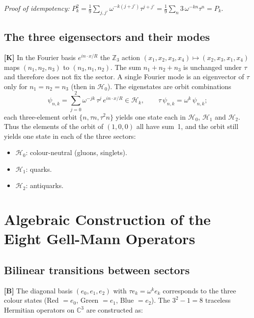 \emph{Proof of idempotency:}
$P_k^2 = \frac{1}{9}\sum_{j,j'}\omega^{-k(j+j')}\tau^{j+j'}
= \frac{1}{9}\sum_n 3\,\omega^{-kn}\tau^n = P_k$. \checkmark

\subsection{The three eigensectors and their modes}

\textbf{[K]} In the Fourier basis $e^{in\cdot x/R}$ the
$\mathbb{Z}_3$ action $(x_1,x_2,x_3,x_4)\mapsto(x_2,x_3,x_1,x_4)$
maps $(n_1,n_2,n_3)$ to $(n_3,n_1,n_2)$. The sum $n_1+n_2+n_3$ is
unchanged under $\tau$ and therefore does not fix the sector. A single
Fourier mode is an eigenvector of $\tau$ only for $n_1=n_2=n_3$ (then in
$\mathcal{H}_0$). The eigenstates are orbit combinations
\begin{equation}
  \psi_{n,k} = \sum_{j=0}^{2}\omega^{-jk}\,\tau^j\,e^{in\cdot x/R}
  \in \mathcal{H}_k, \qquad \tau\,\psi_{n,k} = \omega^k\,\psi_{n,k};
\end{equation}
each three-element orbit $\{n,\tau n,\tau^2 n\}$ yields one state each in
$\mathcal{H}_0$, $\mathcal{H}_1$ and $\mathcal{H}_2$. Thus the elements of
the orbit of $(1,0,0)$ all have sum~1, and the orbit still yields one
state in each of the three sectors:
\begin{itemize}
  \item $\mathcal{H}_0$: colour-neutral (gluons, singlets).
  \item $\mathcal{H}_1$: quarks.
  \item $\mathcal{H}_2$: antiquarks.
\end{itemize}

\section{Algebraic Construction of the Eight Gell-Mann Operators}

\subsection{Bilinear transitions between sectors}

\textbf{[B]} The diagonal basis $(e_0,e_1,e_2)$ with
$\tau e_k = \omega^k e_k$ corresponds to the three colour states
(Red $=e_0$, Green $=e_1$, Blue $=e_2$). The $3^2-1=8$ traceless
Hermitian operators on $\mathbb{C}^3$ are constructed as:

